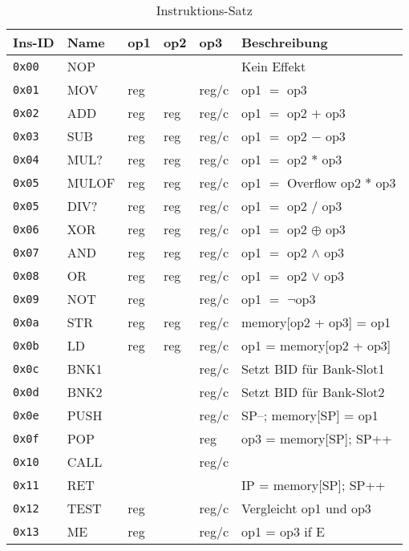 \documentclass{scrartcl}
\begin{document}
\begin{center}
	\begin{table*}
		\caption{\label{table:instructions}Instruktions-Satz}
		\begin{tabular}{l | l l l l | l}
			Ins-ID & Name & op1 & op2 & op3 & Beschreibung \\
			\hline
			\texttt{0x00} & NOP  &  &  &  & Kein Effekt  \\
			\hline
			\texttt{0x01} & MOV  & reg &  & reg/c & op1 $=$ op3\\
			\texttt{0x02} & ADD  & reg & reg & reg/c & op1 $=$ op2 $+$ op3 \\
			\texttt{0x03} & SUB  & reg & reg & reg/c & op1 $=$ op2 $-$ op3 \\
			\texttt{0x04} & MUL? & reg & reg & reg/c & op1 $=$ op2 $*$ op3 \\
			\texttt{0x05} & MULOF& reg & reg & reg/c & op1 $=$ Overflow op2 $*$ op3 \\ 
			\texttt{0x05} & DIV? & reg & reg & reg/c & op1 $=$ op2 $/$ op3 \\
			\texttt{0x06} & XOR  & reg & reg & reg/c & op1 $=$ op2 $\oplus$ op3 \\
			\texttt{0x07} & AND  & reg & reg & reg/c & op1 $=$ op2 $\land$ op3 \\
			\texttt{0x08} & OR   & reg & reg & reg/c & op1 $=$ op2 $\lor$ op3 \\
			\texttt{0x09} & NOT  & reg &  & reg/c & op1 $=$ $\lnot$op3 \\
			\hline 
			\texttt{0x0a} & STR  & reg & reg & reg/c & memory[op2 + op3] = op1  \\
			\texttt{0x0b} & LD   & reg & reg & reg/c & op1 = memory[op2 + op3] \\
			\texttt{0x0c} & BNK1 &  &  & reg/c & Setzt BID für Bank-Slot1 \\
			\texttt{0x0d} & BNK2 &  &  & reg/c & Setzt BID für Bank-Slot2 \\
			\hline
			\texttt{0x0e} & PUSH &  &  & reg/c & SP--; memory[SP] = op1 \\
			\texttt{0x0f} & POP  &  &  & reg & op3 = memory[SP]; SP++ \\
			\texttt{0x10} & CALL &  &  & reg/c & \vtop{
				\hbox{\strut memory[SP] = IP; SP++;}
				\hbox{\strut IP = op3}} \\
			\texttt{0x11} & RET  &  &  &  & IP = memory[SP]; SP++ \\
			\hline
			\texttt{0x12} & TEST & reg &  & reg/c & Vergleicht op1 und op3 \\
			\texttt{0x13} & ME   & reg &  & reg/c & op1 = op3 if E \\

\end{tabular}
\end{table*}
\end{center}
\end{document}
